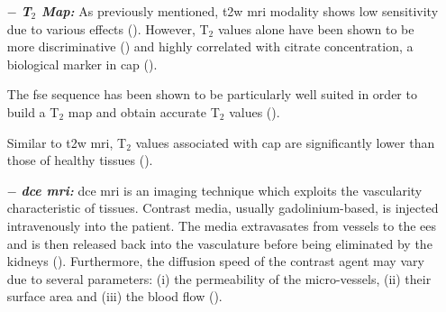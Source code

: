 \begin{enumerate}[leftmargin=*]
\item[$-$] \textbf{\textit{T$_2$ Map:}} As previously mentioned, \ac{t2w} \ac{mri} modality shows low sensitivity due to various effects (\cite{Hegde2013}). However, T$_2$ values alone have been shown to be more discriminative (\cite{Liu2011}) and highly correlated with citrate concentration, a biological marker in \ac{cap} (\cite{Liney1996,Liney1997}). 

%
%
%
%

The \Ac{fse} sequence has been shown to be particularly well suited in order to build a T$_2$ map and obtain accurate T$_2$ values (\cite{Liney1996a}).

Similar to \ac{t2w} \ac{mri}, T$_2$ values associated with \ac{cap} are significantly lower than those of healthy tissues (\cite{Liney1996,Gibbs2001}).

\item[$-$] \textbf{\textit{\ac{dce} \ac{mri}:}} \ac{dce} \ac{mri} is an imaging technique which exploits the vascularity characteristic of tissues. Contrast media, usually gadolinium-based, is injected intravenously into the patient. The media extravasates from vessels to the \ac{ees} and is then released back into the vasculature before being eliminated by the kidneys (\cite{Gribbestad2005}). Furthermore, the diffusion speed of the contrast agent may vary due to several parameters: (i) the permeability of the micro-vessels, (ii) their surface area and (iii) the blood flow (\cite{Padhani2002}).


\end{enumerate}
